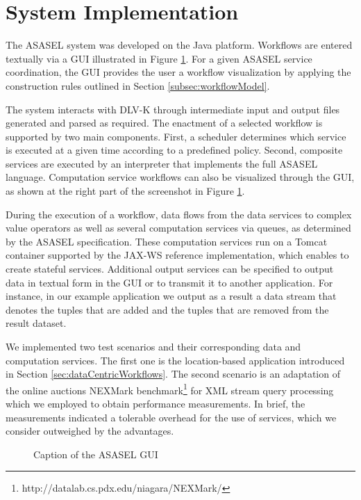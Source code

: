 
\section{System Implementation} \label{sec:systemImplementation}
	
The ASASEL system was developed on the Java platform. Workflows are entered textually via a GUI illustrated in Figure \ref{fig:asaselGUI}. For a given ASASEL service coordination, the GUI provides the user a workflow visualization by applying the construction rules outlined in Section \ref{subsec:workflowModel}.

The system interacts with DLV-K through intermediate input and output files generated and parsed as required. The enactment of a selected workflow is supported by two main components. First, a scheduler determines which service is executed at a given time according to a predefined policy. Second, composite services are executed by an interpreter that implements the full ASASEL language. Computation service workflows can also be visualized through the GUI, as shown at the right part of the screenshot in Figure \ref{fig:asaselGUI}.
	
During the execution of a workflow, data flows from the data services to complex value operators as well as several computation services via queues, as determined by the ASASEL specification. These computation services run on a Tomcat container supported by the JAX-WS reference implementation, which enables to create stateful services. Additional output services can be specified to output data in textual form in the GUI or to transmit it to another application. For instance, in our example application we output as a result a data stream that denotes the tuples that are added and the tuples that are removed from the result dataset.
	
We implemented two test scenarios and their corresponding data and computation services. The first one is the location-based application introduced in Section \ref{sec:dataCentricWorkflows}. The second scenario is an adaptation of the online auctions NEXMark benchmark\footnote{http://datalab.cs.pdx.edu/niagara/NEXMark/} for XML stream query processing which we employed to obtain performance measurements. In brief, the measurements indicated a tolerable overhead for the use of services, which we consider outweighed by the advantages.
	
	\begin{figure}
   \begin{center}
   \end{center}
   \caption{Caption of the ASASEL GUI}
   \label{fig:asaselGUI}
\end{figure}

